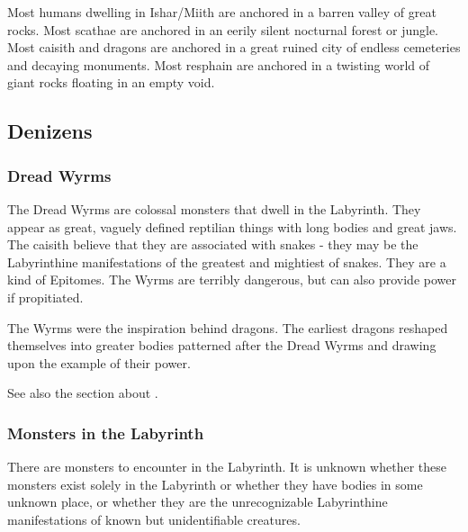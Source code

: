 Most humans dwelling in Ishar/Miith are anchored in a barren valley of great rocks. 
Most scathae are anchored in an eerily silent nocturnal forest or jungle.
Most caisith and dragons are anchored in a great ruined city of endless cemeteries and decaying monuments.
Most resphain are anchored in a twisting world of giant rocks floating in an empty void.









\subsection{Denizens}





\subsubsection{Dread Wyrms}
The Dread Wyrms are colossal monsters that dwell in the Labyrinth. They appear as great, vaguely defined reptilian things with long bodies and great jaws. The caisith believe that they are associated with snakes - they may be the Labyrinthine manifestations of the greatest and mightiest of snakes. They are a kind of Epitomes. The Wyrms are terribly dangerous, but can also provide power if propitiated. 

The Wyrms were the inspiration behind dragons. The earliest dragons reshaped themselves into greater bodies patterned after the Dread Wyrms and drawing upon the example of their power. 

See also the section about .





\subsubsection{Monsters in the Labyrinth}
There are monsters to encounter in the Labyrinth. It is unknown whether these monsters exist solely in the Labyrinth or whether they have bodies in some unknown place, or whether they are the unrecognizable Labyrinthine manifestations of known but unidentifiable creatures.
















